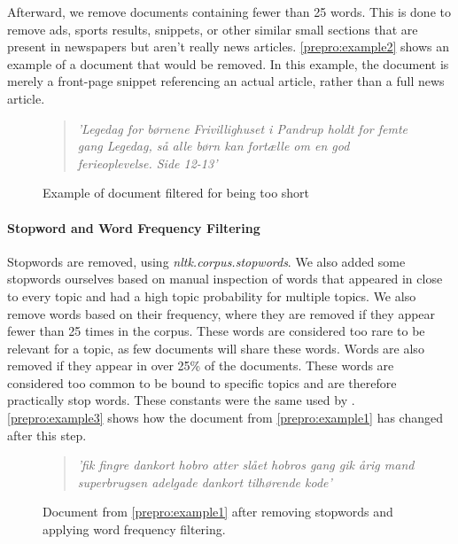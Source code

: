 Afterward, we remove documents containing fewer than 25 words.
This is done to remove ads, sports results, snippets, or other similar small sections that are present in newspapers but aren't really news articles.
\autoref{prepro:example2} shows an example of a document that would be removed. In this example, the document is merely a front-page snippet referencing an actual article, rather than a full news article.
\begin{figure}[h]
	\begin{quote}
		\textit{
			'Legedag for børnene Frivillighuset i Pandrup holdt for femte gang Legedag, så alle børn kan fortælle om en god ferieoplevelse. Side 12-13'
		}
	\end{quote}
	\caption{Example of document filtered for being too short}
	\label{prepro:example2}
\end{figure}


\paragraph{Stopword and Word Frequency Filtering}
Stopwords are removed, using \emph{nltk.corpus.stopwords}. We also added some stopwords ourselves based on manual inspection of words that appeared in close to every topic and had a high topic probability for multiple topics.
We also remove words based on their frequency, where they are removed if they appear fewer than 25 times in the corpus.
These words are considered too rare to be relevant for a topic, as few documents will share these words.
Words are also removed if they appear in over 25\% of the documents.
These words are considered too common to be bound to specific topics and are therefore practically stop words.
These constants were the same used by \cite{quanti}.
\autoref{prepro:example3} shows how the document from \autoref{prepro:example1} has changed after this step.
\begin{figure}[h]
	\begin{quote}
		\textit{
			'fik fingre dankort hobro atter slået hobros gang gik årig mand superbrugsen adelgade dankort tilhørende kode'
		}
	\end{quote}
	\caption{Document from \autoref{prepro:example1} after removing stopwords and applying word frequency filtering.}
	\label{prepro:example3}
\end{figure}


